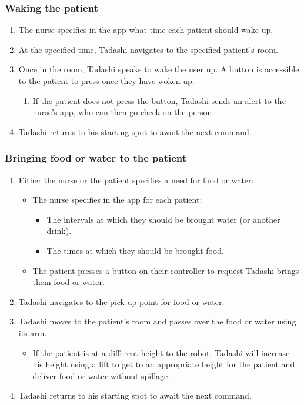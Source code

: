 \documentclass{article}
\begin{document}
\subsubsection{Waking the patient}
\begin{enumerate}
\item The nurse specifies in the app what time each patient should wake up.
\item At the specified time, Tadashi navigates to the specified patient's room.
\item Once in the room, Tadashi speaks to wake the user up. A button is accessible to the patient to press once they have woken up:
  \begin{enumerate} 
  \item If the patient does not press the button, Tadashi sends an alert to the nurse's app, who can then go check on the person. 
  \end{enumerate}
\item Tadashi returns to his starting spot to await the next command. 
\end{enumerate}

\subsubsection{Bringing food or water to the patient}
\begin{enumerate}
\item Either the nurse or the patient specifies a need for food or water:
  \begin{itemize}
  \item The nurse specifies in the app for each patient:
    \begin{itemize}
    \item The intervals at which they should be brought water (or another drink).
    \item The times at which they should be brought food.
    \end{itemize}
  \item The patient presses a button on their controller to request Tadashi brings them food or water. 
  \end{itemize}
\item Tadashi navigates to the pick-up point for food or water.
\item Tadashi moves to the patient's room and passes over the food or water using its arm.
  \begin{itemize}
  \item If the patient is at a different height to the robot, Tadashi will increase his height using a lift to get to an appropriate height for the patient and deliver food or water without spillage. 
  \end{itemize}
\item Tadashi returns to his starting spot to await the next command.
\end{enumerate}
\end{document}
